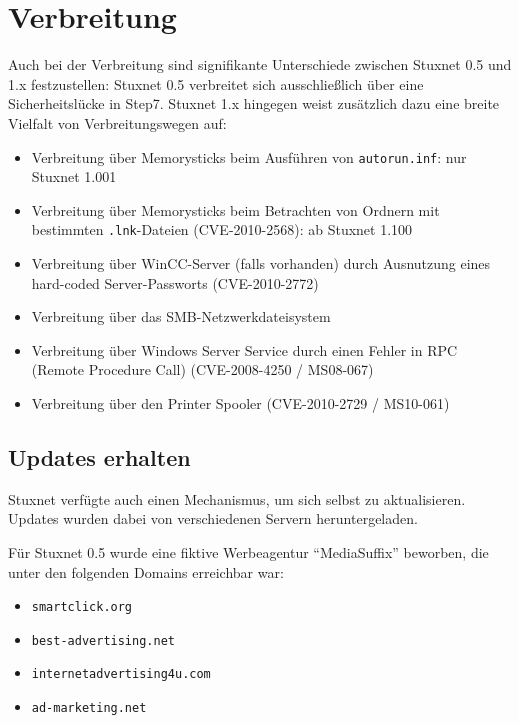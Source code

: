 \documentclass{article}
\begin{document}
\section{Verbreitung}

Auch bei der Verbreitung sind signifikante Unterschiede zwischen Stuxnet 0.5 und 1.x festzustellen:
Stuxnet 0.5 verbreitet sich ausschließlich über eine Sicherheitslücke in Step7.
Stuxnet 1.x hingegen weist zusätzlich dazu eine breite Vielfalt von Verbreitungswegen auf:

\begin{itemize}
\item Verbreitung über Memorysticks beim Ausführen von \texttt{autorun.inf}: nur Stuxnet 1.001\cite{dossier} %
\item Verbreitung über Memorysticks beim Betrachten von Ordnern mit bestimmten \texttt{.lnk}-Dateien (CVE-2010-2568\cite{CVE_lnk}): ab Stuxnet 1.100
\item Verbreitung über WinCC-Server (falls vorhanden) durch Ausnutzung eines hard-coded Server-Passworts (CVE-2010-2772\cite{CVE_wincc})
\item Verbreitung über das SMB-Netzwerkdateisystem
\item Verbreitung über Windows Server Service durch einen Fehler in RPC (Remote Procedure Call) (CVE-2008-4250\cite{CVE_rpc} / MS08-067\cite{MS_rpc})
\item Verbreitung über den Printer Spooler (CVE-2010-2729\cite{CVE_spooler} / MS10-061\cite{MS_spooler})
\end{itemize} %

\subsection{Updates erhalten}

Stuxnet verfügte auch einen Mechanismus, um sich selbst zu aktualisieren.
Updates wurden dabei von verschiedenen Servern heruntergeladen.

Für Stuxnet 0.5 wurde eine fiktive Werbeagentur ``MediaSuffix'' beworben, die unter den folgenden Domains erreichbar war:

\begin{itemize}
\item \texttt{smartclick.org}
\item \texttt{best-advertising.net}
\item \texttt{internetadvertising4u.com}
\item \texttt{ad-marketing.net}
\end{itemize}
\end{document}
